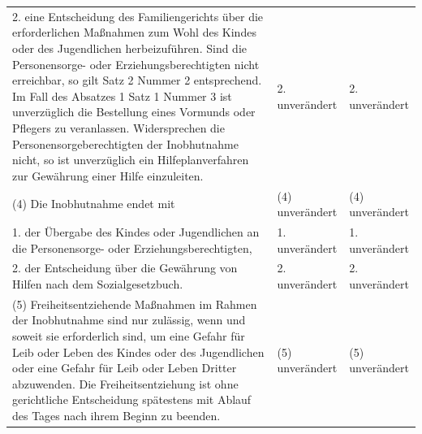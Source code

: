 \documentclass[10pt,a4paper,landscape]{article}
\begin{document}
\begin{longtable}{|L{8.2cm}|L{8.2cm}|L{8.2cm}|}
\hhline{|---|}
2.  \newline eine Entscheidung des Familiengerichts  \newline über die erforderlichen Maßnahmen zum  \newline Wohl des Kindes oder des Jugendlichen  \newline herbeizuführen.  \newline Sind die Personensorge- oder  \newline Erziehungsberechtigten nicht erreichbar, so  \newline gilt Satz 2 Nummer 2 entsprechend. Im Fall  \newline des Absatzes 1 Satz 1 Nummer 3 ist  \newline unverzüglich die Bestellung eines  \newline Vormunds oder Pflegers zu veranlassen.  \newline Widersprechen die  \newline Personensorgeberechtigten der  \newline Inobhutnahme nicht, so ist unverzüglich ein  \newline Hilfeplanverfahren zur Gewährung einer  \newline Hilfe einzuleiten. & 2. unverändert & 2. unverändert \\
\hhline{|---|}
(4) Die Inobhutnahme endet mit & (4) unverändert & (4) unverändert \\
\hhline{|---|}
1.  \newline der Übergabe des Kindes oder  \newline Jugendlichen an die Personensorge- oder  \newline Erziehungsberechtigten, & 1. unverändert & 1. unverändert \\
\hhline{|---|}
2.  \newline der Entscheidung über die Gewährung von  \newline Hilfen nach dem Sozialgesetzbuch. & 2. unverändert & 2. unverändert \\
\hhline{|---|}
(5) Freiheitsentziehende Maßnahmen im  \newline Rahmen der Inobhutnahme sind nur  \newline zulässig, wenn und soweit sie erforderlich  \newline sind, um eine Gefahr für Leib oder Leben  \newline des Kindes oder des Jugendlichen oder  \newline eine Gefahr für Leib oder Leben Dritter  \newline abzuwenden. Die Freiheitsentziehung ist  \newline ohne gerichtliche Entscheidung spätestens  \newline mit Ablauf des Tages nach ihrem Beginn  \newline zu beenden. & (5) unverändert & (5) unverändert \\

\end{longtable}
\end{document}
